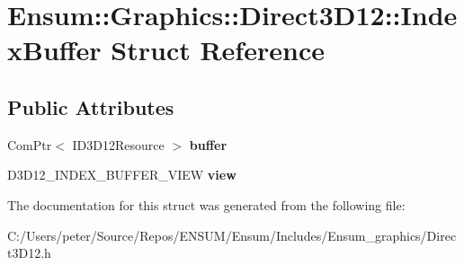 \hypertarget{struct_ensum_1_1_graphics_1_1_direct3_d12_1_1_index_buffer}{}\section{Ensum\+:\+:Graphics\+:\+:Direct3\+D12\+:\+:Index\+Buffer Struct Reference}
\label{struct_ensum_1_1_graphics_1_1_direct3_d12_1_1_index_buffer}
\subsection*{Public Attributes}
\begin{DoxyCompactItemize}
\item 
Com\+Ptr$<$ I\+D3\+D12\+Resource $>$ {\bfseries buffer}\hypertarget{struct_ensum_1_1_graphics_1_1_direct3_d12_1_1_index_buffer_a139d2959ce47f53d17ab0bad080869a8}{}\label{struct_ensum_1_1_graphics_1_1_direct3_d12_1_1_index_buffer_a139d2959ce47f53d17ab0bad080869a8}

\item 
D3\+D12\+\_\+\+I\+N\+D\+E\+X\+\_\+\+B\+U\+F\+F\+E\+R\+\_\+\+V\+I\+EW {\bfseries view}\hypertarget{struct_ensum_1_1_graphics_1_1_direct3_d12_1_1_index_buffer_a87dacc5eeee5257e978c0b49fde4b514}{}\label{struct_ensum_1_1_graphics_1_1_direct3_d12_1_1_index_buffer_a87dacc5eeee5257e978c0b49fde4b514}

\end{DoxyCompactItemize}


The documentation for this struct was generated from the following file\+:\begin{DoxyCompactItemize}
\item 
C\+:/\+Users/peter/\+Source/\+Repos/\+E\+N\+S\+U\+M/\+Ensum/\+Includes/\+Ensum\+\_\+graphics/Direct3\+D12.\+h\end{DoxyCompactItemize}
